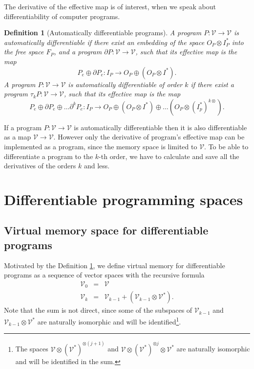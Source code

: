 \documentclass[smallcondensed]{svjour3}
\newcommand{\VV}{\mathcal{V}}
\newcommand{\D}{\partial}
\newcommand{\sumd}{\tau}
\newtheorem{definicija}{Definition}[section]
\begin{document}
The derivative of the effective map is of interest, when we speak about
differentiability of computer programs. 
\begin{definicija}[Automatically differentiable programs]
  \label{def:program_derivative}
  A program $P:\VV\to \VV$ is \emph{automatically differentiable} if there exist
  an embedding of the space $O_P\otimes I_P^*$ into the free space $F_P$, and a program $\D P:\VV\to \VV$,
  such that its effective map is the map
  \begin{equation}
    \label{eq:program_derivative}
    P_e\oplus \D P_e:I_P\rightarrow O_P\oplus (O_P\otimes I^*).
  \end{equation}
  A program $P:\VV\to \VV$ is \emph{automatically differentiable of order $k$}
  if there exist a program $\sumd_k P:\VV\to \VV$,
  such that its effective map is the map
  \begin{equation}
    \label{eq:program_derivative_higher}
    P_e\oplus \D P_e\oplus \ldots \D^k P_e:I_P\rightarrow O_P\oplus \left(O_P\otimes I^*\right)\oplus\ldots \left( O_P\otimes \left( I_p^*\right)^{k\otimes} \right).
  \end{equation}
\end{definicija}

If a program $P:\VV\to \VV$ is automatically differentiable then it is also
differentiable as a map $\VV\to\VV$. However only the derivative of program's
effective map can be implemented as a program, since the memory space is limited to $\VV$. 
To be able to differentiate a program to the $k$-th order, we have to calculate
and save all the derivatives of the orders $k$ and less.
\section{Differentiable programming spaces}
\subsection{Virtual memory space for differentiable programs}
Motivated by the Definition
\ref{def:program_derivative}, we define
virtual memory for differentiable programs  as a sequence of vector spaces with
the recursive formula
\begin{eqnarray}
  \label{eq:universal_space}
  \VV_0 &=& \VV\\
  \VV_k &=& \VV_{k-1}+\left(\VV_{k-1}\otimes \VV^*\right).
\end{eqnarray}
Note that the sum is not direct, since some of the subspaces of $\VV_{k-1}$ and
$\VV_{k-1}\otimes \VV^*$ are naturally isomorphic and will be
identified\footnote{The spaces $\VV\otimes(\VV^*)^{\otimes (j+1)}$ and
  $\VV\otimes (\VV^*)^{\otimes j}\otimes \VV^*$ are naturally isomorphic and
  will be identified in the sum.
}.
\end{document}
